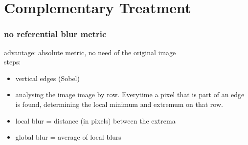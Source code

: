 \section[Compl. Treatment]{Complementary Treatment}
\begin{frame}
  \frametitle{no referential blur metric}
  
  advantage: absolute metric, no need of the original image\\
  steps:
  \begin{itemize}
  \item vertical edges (Sobel)
  \item analysing the image image by row. Everytime a pixel that is part of an edge is found, determining the local minimum and extremum on that row.
  \item local blur = distance (in pixels) between the extrema
  \item global blur = average of local blurs
  \end{itemize}
\end{frame}
